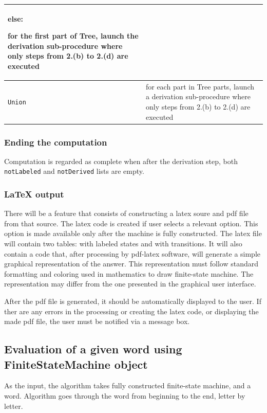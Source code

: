 \documentclass{article}
\begin{document}
\begin{tabularx}{\textwidth}{l|X}
\vspace{5pt}
\textbf{else}:

for the first part of Tree, launch the derivation sub-procedure where only steps from 2.(b) to 2.(d)
are executed \\ \hline

\verb|Union| &

for each part in Tree parts, launch a derivation sub-procedure where only steps from 2.(b) to 2.(d)
are executed \\

\end{tabularx}

\subsubsection{Ending the computation}

Computation is regarded as complete when after the derivation step, both \verb|notLabeled| and
\verb|notDerived| lists are empty.

\subsubsection*{LaTeX output}

There will be a feature that consists of constructing a latex soure and pdf file from that source.
The latex code is created if user selects a relevant option. This option is made available only
after the machine is fully constructed. The latex file will contain two tables: with labeled states
and with transitions. It will also contain a code that, after processing by pdf-latex software, will
generate a simple graphical representation of the answer. This representation must follow standard
formatting and coloring used in mathematics to draw finite-state machine. The representation may
differ from the one presented in the graphical user interface.

After the pdf file is generated, it should be automatically displayed to the user. If ther are any
errors in the processing or creating the latex code, or displaying the made pdf file, the user must
be notified via a message box.

\newpage

\subsection{Evaluation of a given word using FiniteStateMachine object}

As the input, the algorithm takes fully constructed finite-state machine, and a word. Algorithm goes
through the word from beginning to the end, letter by letter.
\end{document}
